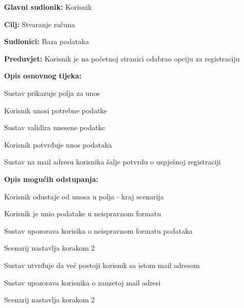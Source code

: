 					\noindent {}
					\begin{packed_item}
	
						\item \textbf{Glavni sudionik: }Korisnik
						\item  \textbf{Cilj:} Stvaranje računa
						\item  \textbf{Sudionici:} Baza podataka
						\item  \textbf{Preduvjet:} Korisnik je na početnoj stranici odabrao opciju za registraciju
						\item  \textbf{Opis osnovnog tijeka:}
						
						\item[] \begin{packed_enum}
							\item Sustav prikazuje polja za unos
							\item Korisnik unosi potrebne podatke
							\item Sustav validira unesene podatke
							\item Korisnik potvrđuje unos podataka
							\item Sustav na mail adresu korisnika šalje potvrdu o uspješnoj registraciji
						\end{packed_enum}
						
						\item  \textbf{Opis mogućih odstupanja:}

						\item[] \begin{packed_item}
							\item[2.a] Korisnik odustaje od unosa u polja - kraj scenarija
							\item[3.a] Korisnik je unio podatake u neispravnom formatu
							\item[] \begin{packed_enum}
								\item Sustav upozorava korisika o neispravnom formatu podataka
								\item Scenarij nastavlja korakom 2 
							\end{packed_enum}	
							\item[5.a] Sustav utvrđuje da već postoji korisnik sa istom mail adresom
							\item[] \begin{packed_enum}
								\item Sustav upozorava korisnika o zauzetoj mail adresi
								\item Scenarij nastavlja korakom 2 
							\end{packed_enum}					
						\end{packed_item}
					\end{packed_item}

